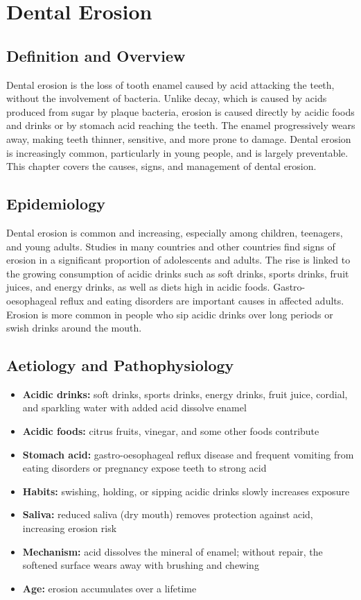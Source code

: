 \chapter{Dental Erosion}

\section*{Definition and Overview}
Dental erosion is the loss of tooth enamel caused by acid attacking the teeth, without the involvement of bacteria. Unlike decay, which is caused by acids produced from sugar by plaque bacteria, erosion is caused directly by acidic foods and drinks or by stomach acid reaching the teeth. The enamel progressively wears away, making teeth thinner, sensitive, and more prone to damage. Dental erosion is increasingly common, particularly in young people, and is largely preventable. This chapter covers the causes, signs, and management of dental erosion.

\section*{Epidemiology}
Dental erosion is common and increasing, especially among children, teenagers, and young adults. Studies in many countries and other countries find signs of erosion in a significant proportion of adolescents and adults. The rise is linked to the growing consumption of acidic drinks such as soft drinks, sports drinks, fruit juices, and energy drinks, as well as diets high in acidic foods. Gastro-oesophageal reflux and eating disorders are important causes in affected adults. Erosion is more common in people who sip acidic drinks over long periods or swish drinks around the mouth.

\section*{Aetiology and Pathophysiology}
\begin{itemize}
    \item \textbf{Acidic drinks:} soft drinks, sports drinks, energy drinks, fruit juice, cordial, and sparkling water with added acid dissolve enamel
    \item \textbf{Acidic foods:} citrus fruits, vinegar, and some other foods contribute
    \item \textbf{Stomach acid:} gastro-oesophageal reflux disease and frequent vomiting from eating disorders or pregnancy expose teeth to strong acid
    \item \textbf{Habits:} swishing, holding, or sipping acidic drinks slowly increases exposure
    \item \textbf{Saliva:} reduced saliva (dry mouth) removes protection against acid, increasing erosion risk
    \item \textbf{Mechanism:} acid dissolves the mineral of enamel; without repair, the softened surface wears away with brushing and chewing
    \item \textbf{Age:} erosion accumulates over a lifetime
\end{itemize}

